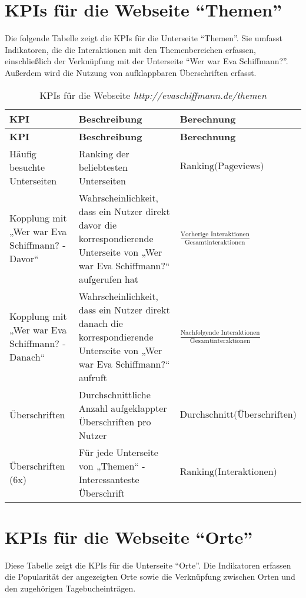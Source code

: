 \section{KPIs für die Webseite ``Themen''}
Die folgende Tabelle zeigt die KPIs für die Unterseite ``Themen''. Sie umfasst Indikatoren, die die Interaktionen mit den Themenbereichen erfassen, einschließlich der Verknüpfung mit der Unterseite ``Wer war Eva Schiffmann?''. Außerdem wird die Nutzung von aufklappbaren Überschriften erfasst.

\renewcommand{\arraystretch}{1.5} %
\begin{xltabular}{\textwidth}{|X|X|X|}
    \caption{KPIs für die Webseite \textit{http://evaschiffmann.de/themen}} \label{tab:kpi_themen} \\
    \hline
    \textbf{KPI} & \textbf{Beschreibung} & \textbf{Berechnung} \\ \hline
    \endfirsthead

    \hline
    \textbf{KPI} & \textbf{Beschreibung} & \textbf{Berechnung} \\ \hline
    \endhead

    \hline
    \endfoot

    \hline
    \endlastfoot

    Häufig besuchte Unterseiten & Ranking der beliebtesten Unterseiten & {\footnotesize \(\text{Ranking(Pageviews)}\)} \\ \hline
    Kopplung mit „Wer war Eva Schiffmann? - Davor“ & Wahrscheinlichkeit, dass ein Nutzer direkt davor die korrespondierende Unterseite von „Wer war Eva Schiffmann?“ aufgerufen hat & {\footnotesize \(\frac{\text{Vorherige Interaktionen}}{\text{Gesamtinteraktionen}}\)} \\ \hline
    Kopplung mit „Wer war Eva Schiffmann? - Danach“ & Wahrscheinlichkeit, dass ein Nutzer direkt danach die korrespondierende Unterseite von „Wer war Eva Schiffmann?“ aufruft & {\footnotesize \(\frac{\text{Nachfolgende Interaktionen}}{\text{Gesamtinteraktionen}}\)} \\ \hline
    Überschriften & Durchschnittliche Anzahl aufgeklappter Überschriften pro Nutzer & {\footnotesize \(\text{Durchschnitt(Überschriften)}\)} \\ \hline
    Überschriften (6x) & Für jede Unterseite von „Themen“ - Interessanteste Überschrift & {\footnotesize \(\text{Ranking(Interaktionen)}\)} \\ \hline
\end{xltabular}

\section{KPIs für die Webseite ``Orte''}
Diese Tabelle zeigt die KPIs für die Unterseite ``Orte''. Die Indikatoren erfassen die Popularität der angezeigten Orte sowie die Verknüpfung zwischen Orten und den zugehörigen Tagebucheinträgen.

